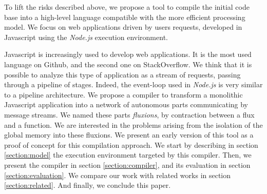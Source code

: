 To lift the risks described above, we propose a tool to compile the initial code base into a high-level language compatible with the more efficient processing model.
We focus on web applications driven by users requests, developed in Javascript using the \textit{Node.js} execution environment.

Javascript is increasingly used to develop web applications.
It is the most used language on Github, and the second one on StackOverflow.
We think that it is possible to analyze this type of application as a stream of requests, passing through a pipeline of stages.
Indeed, the event-loop used in \textit{Node.js} is very similar to a pipeline architecture.
We propose a compiler to transform a monolithic Javascript application into a network of autonomous parts communicating by message streams.
We named these parts \textit{fluxions}, by contraction between a flux and a function.
We are interested in the problems arising from the isolation of the global memory into these fluxions.
We present an early version of this tool as a proof of concept for this compilation approach.
We start by describing in section \ref{section:model} the execution environment targeted by this compiler.
Then, we present the compiler in section \ref{section:compiler}, and its evaluation in section \ref{section:evaluation}.
We compare our work with related works in section \ref{section:related}.
And finally, we conclude this paper.